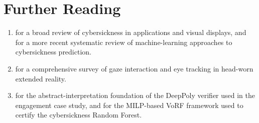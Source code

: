 \documentclass[graybox]{svmult}
\begin{document}
\section{Further Reading}
\begin{enumerate}\itemsep6pt
\item \citet{rebenitsch2016cybersickness} for a broad review of cybersickness in applications and visual displays, and \citet{yang2022cybersicknessml} for a more recent systematic review of machine-learning approaches to cybersickness prediction.
\item \citet{plopski2023eye} for a comprehensive survey of gaze interaction and eye tracking in head-worn extended reality.
\item \citet{singh2019deeppoly} for the abstract-interpretation foundation of the DeepPoly verifier used in the engagement case study, and \citet{tornblom2019vorf} for the MILP-based VoRF framework used to certify the cybersickness Random Forest.
\end{enumerate}

\printbibliography
\printindex
\end{document}
